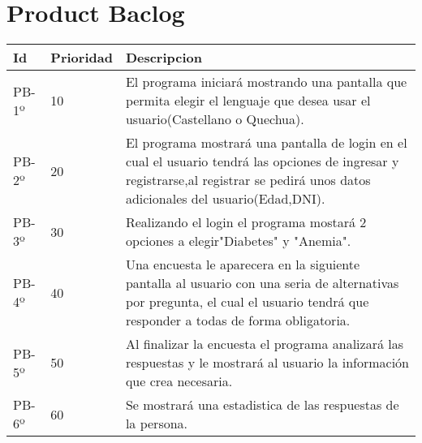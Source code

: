 \chapter{Product Baclog}



\begin{table}[htbp]
	\begin{center}
		\begin{tabular}{| p{3.2cm}| p{4.2cm} |p{7.8cm} |}
			\hline
			\textbf{Id} & \textbf {Prioridad} & \textbf{Descripcion} \\\hline    
			PB-1º & 10 & El programa iniciará mostrando una pantalla que permita elegir el lenguaje que desea usar el usuario(Castellano o Quechua).\\ \hline
			PB-2º & 20 & El programa mostrará una pantalla de login en el cual el usuario tendrá las opciones de ingresar y registrarse,al registrar se pedirá unos datos adicionales del usuario(Edad,DNI).\\ \hline
			PB-3º & 30 & Realizando el login el programa mostará 2 opciones a elegir"Diabetes" y "Anemia".\\ \hline
			PB-4º & 40 & Una encuesta le aparecera en la siguiente pantalla al usuario con una seria de alternativas por pregunta, 
			el cual el usuario tendrá que responder a todas de forma obligatoria.\\ \hline
			PB-5º & 50 & Al finalizar la encuesta el programa analizará las respuestas y le mostrará al usuario la información que crea necesaria.\\ \hline
			PB-6º & 60 & Se mostrará una estadistica de las respuestas de la persona.\\ \hline
		\end{tabular}
	\end{center}
\end{table}
